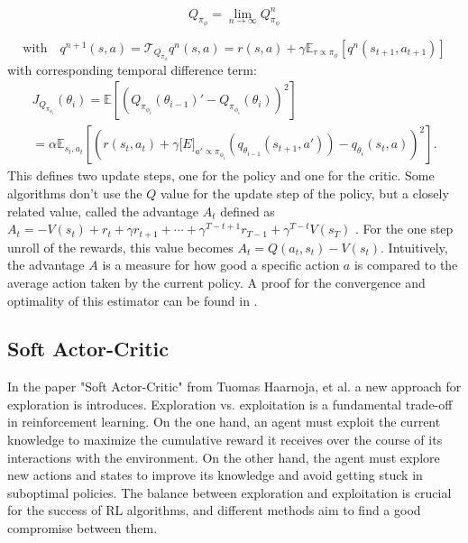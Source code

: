\begin{equation}
    Q_{\pi_{\phi}} = \lim_{n \to \infty} Q^n_{\pi_{\phi}}
\end{equation}

\begin{equation*}
    \text{with}\quad q^{n+1}(s,a) = \mathcal{T}_{Q_{\pi_{\phi}}}q^n(s,a) = r(s,a) + \gamma \mathbb{E}_{\tau \propto {\pi_{\phi}}}[q^n(s_{t+1}, a_{t+1})]
\end{equation*}
with corresponding temporal difference term:
\begin{equation}
    \begin{aligned}
        J_{Q_{\pi_{\phi_i}}}(\theta_{i}) = \mathbb{E}\left[\left({Q_{\pi_{\phi_i}}}(\theta_{i-1})' - Q_{\pi_{\phi_i}}(\theta_{i}) \right)^2\right]\\
        = \alpha \mathbb{E}_{s_t, a_t}\left[\left( r(s_t, a_t) + \gamma \mathbb[E]_{a' \propto \pi_{\phi_i}}\left( q_{\theta_{i-1}}(s_{t+1}, a')\right) - q_{\theta_{i}}(s_t, a)\right)^2\right].
    \end{aligned}
\end{equation}
This defines two update steps, one for the policy and one for the critic. Some algorithms don't use the $Q$ value for the update step of the policy, but a closely 
related value, called the advantage $A_t$ defined as $A_t = -V(s_t) + r_t + \gamma r_{t+1} + \cdots + \gamma^{T-t+1} r_{T-1} + \gamma^{T-t} V(s_T)$ \cite{A2C}. For the one step 
unroll of the rewards, this value becomes $A_t = Q(a_t, s_t) - V(s_t)$. 
Intuitively, the advantage $A$ is a measure for how good a specific action $a$ is compared to the average action taken by the current policy. 
A proof for the convergence and optimality of this estimator can be found in \cite{proof_A}.

\subsection{Soft Actor-Critic}
\label{SAC}
In the paper "Soft Actor-Critic" from Tuomas Haarnoja, et al. \cite{haarnoja2018soft} a new approach for exploration is introduces. Exploration vs. exploitation 
is a fundamental trade-off in reinforcement learning. On the one hand, an agent must exploit the current knowledge to maximize the cumulative reward it receives 
over the course of its interactions with the environment. On the other hand, the agent must explore new actions and states to improve its knowledge and avoid getting stuck in suboptimal policies. 
The balance between exploration and exploitation is crucial for the success of RL algorithms, and different methods aim to find a good compromise between them.

